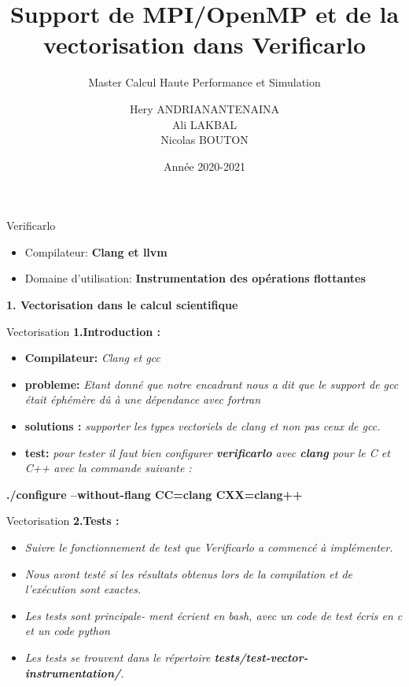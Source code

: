 \documentclass{beamer}
\title[Support pour Verificarlo]{Support de MPI/OpenMP et de la vectorisation dans Verificarlo}
\subtitle{Master Calcul Haute Performance et Simulation}
\author[Hery, Ali, Nicolas]{Hery ANDRIANANTENAINA \\ Ali LAKBAL \\ Nicolas BOUTON}
\institute{\textbf{Encadrant:} Eric PETIT}
\date{Année 2020-2021}
\begin{document}
\maketitle

\begin{frame}{Verificarlo}

  \begin{itemize}
  \item Compilateur: \textbf{ Clang et llvm} 
  \item Domaine d'utilisation: \textbf{ Instrumentation des opérations flottantes}
  \end{itemize}
  
  \textbf{1. Vectorisation dans le calcul scientifique}
  
\end{frame}
\begin{frame}{Vectorisation}
\textbf{1.Introduction :}
  \begin{itemize}
        \item \textbf{Compilateur:} \textit{ Clang et gcc} 
        \item \textbf{probleme:} \textit{ Etant donné que notre encadrant nous a dit que le support de
gcc était éphémère dû à une dépendance avec fortran}
         \item \textbf{solutions : } \textit{supporter les types vectoriels de clang et non pas ceux de gcc. }
         \item \textbf{test: } \textit{ pour tester il faut bien configurer \textbf{verificarlo} avec \textbf {clang} pour le C et C++ avec la commande suivante : }
         \end{itemize}
         \begin{center}
        \textbf{\color{blue} ./configure --without-flang CC=clang CXX=clang++ }      
          \end{center}
     
    
\end{frame}

\begin{frame}{Vectorisation}
\textbf{2.Tests :}
  \begin{itemize}
        \item\textit{ Suivre le fonctionnement de test que
Verificarlo a commencé à implémenter. } 
         \item\textit{Nous avont testé si les résultats obtenus lors de la compilation et de l’exécution sont exactes.} 
        
         \item \textit{Les tests sont principale-
ment écrient en bash, avec un code de test écris en c et un code python}  
         \item \textit{Les tests se trouvent dans
le répertoire \textbf{ tests/test-vector-instrumentation/}.} 
         \end{itemize}
\end{frame}
\end{document}
